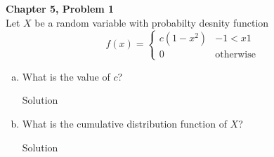 \documentclass{article}
\begin{document}
\begin{spacing}{1.1}
\maketitle

\newpage
\begin{homeworkProblem}
  {\bf Chapter 5, Problem 1}\\
  Let $X$ be a random variable with probabilty desnity function 
  \[f(x) =
      \left\{
        \begin{array}{lr}
          c(1 - x^2) & -1 < x 1 \\ 
          0 & \text{otherwise}
        \end{array}
      \right.\]
  \begin{enumerate}[(a)]
    \item  What is the value of $c$?
      \begin{homeworkSection}{Solution}

      \end{homeworkSection}
    \item What is the cumulative distribution function of $X$?
      \begin{homeworkSection}{Solution}

      \end{homeworkSection}
  \end{enumerate}
\end{homeworkProblem}

  
\end{spacing}
\end{document}
